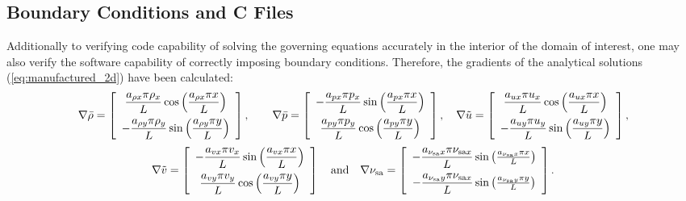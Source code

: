 \documentclass[10pt]{article}
\newcommand{\sa}{\nu_{\mathrm{sa}}}
\newcommand{\tsa}{\mathrm{sa}}
\newcommand{\brho}{\bar{\rho}}
\newcommand{\bp}{\bar{p}}
\newcommand{\tu}{\tilde{u}}
\newcommand{\tv}{\tilde{v}}
\begin{document}
\subsection{Boundary Conditions and C Files}
Additionally to verifying code capability of solving the governing equations accurately in the interior of the domain of interest, one may also verify the software capability of correctly imposing boundary conditions. Therefore, the gradients of the  analytical solutions (\ref{eq:manufactured_2d}) have been calculated:
\begin{equation*}
\nabla  \brho= \left[ \begin{array}{c}
 \dfrac{  a_{\rho x}  \pi \rho_x}{L} \cos\left( \dfrac{ a_{\rho x}  \pi  x}{L}\right)\vspace{5pt} \\
-\dfrac{  a_{\rho y}  \pi \rho_y}{L} \sin\left( \dfrac{ a_{\rho y}  \pi  y}{L}\right)
\end{array} \right],
\qquad
\nabla \bp = \left[ \begin{array}{c}
- \dfrac{  a_{px}  \pi p_x}{L} \sin\left( \dfrac{ a_{px}  \pi  x}{L}\right)\vspace{5pt}\\
  \dfrac{  a_{py}  \pi p_y}{L} \cos\left( \dfrac{ a_{py}  \pi  y}{L}\right)
\end{array} \right],
\quad
\nabla \tu = \left[ \begin{array}{c}
  \dfrac{  a_{ux}  \pi u_x}{L} \cos\left( \dfrac{ a_{ux}  \pi  x}{L}\right)\vspace{5pt}\\
 -   \dfrac{  a_{uy}  \pi u_y}{L} \sin\left( \dfrac{ a_{uy}  \pi  y}{L}\right)
\end{array} \right],
\end{equation*}
\begin{equation*}
\nabla  \tv= \left[ \begin{array}{c}
-  \dfrac{  a_{vx}  \pi v_x}{L}  \sin\left( \dfrac{ a_{vx}  \pi  x}{L}\right)\vspace{5pt}\\
    \dfrac{  a_{vy}  \pi v_y}{L} \cos\left( \dfrac{ a_{vy}  \pi  y}{L}\right)
\end{array} \right]
\quad\mbox{and}\quad
\nabla \sa = \left[ \begin{array}{c}
-\dfrac{  a_{\sa x}  \pi  \nu_{\tsa x} }{L} \sin\left(\frac{a_{\sa x} \pi x}{L}\right)\vspace{5pt}\\
-  \dfrac{  a_{\sa y}  \pi  \nu_{\tsa x}}{L}  \sin\left(\frac{a_{\sa y} \pi y}{L}\right)
\end{array} \right].
\end{equation*}
\end{document}
